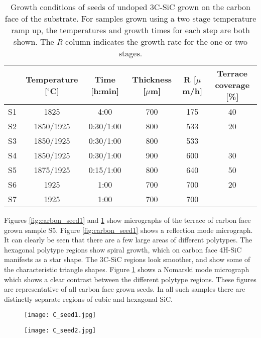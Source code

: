\begin{table}[h]
\small
\caption{Growth conditions of seeds of undoped 3C-SiC grown on the carbon face of the substrate. For samples grown using a two stage temperature ramp up, the temperatures and growth times for each step are both shown. The \emph{R}-column indicates the growth rate for the one or two stages.}
\label{tab:seeds}
\begin{center}
\begin{tabular}{l c c c c c}
  \hline                       
  \hline       
  \vspace{1mm}
   & \small{Temperature [$^\circ$C]} & \small{Time [h:min]} & \small{Thickness [$\mu$m]} & R [$\mu$m/h] &\small{Terrace coverage [\%]}\\
    \hline
  S1 & 1825 & 4:00 & 700 & 175 & 40\\
  S2 & 1850/1925 & 0:30/1:00 & 800 & 533 &20\\
  S3 & 1850/1925 & 0:30/1:00 & 800 & 533 &\\
  S4 & 1850/1925 & 0:30/1:00 & 900 & 600 &30\\
  S5 & 1875/1925 & 0:15/1:00 & 800 & 640 & 50\\
  S6 & 1925 & 1:00 & 700 & 700 & 20\\
  S7 & 1925 & 1:00 & 700 & 700 &\\
  \hline  
\end{tabular}
\end{center}
\end{table}


Figures \ref{fig:carbon_seed1} and \ref{fig:carbon_seed2} show micrographs of the terrace of carbon face grown sample S5. Figure \ref{fig:carbon_seed1} shows a reflection mode micrograph. It can clearly be seen that there are a few large areas of different polytypes. The hexagonal polytype regions show spiral growth, which on carbon face 4H-SiC manifests as a star shape. The 3C-SiC regions look smoother, and show some of the characteristic triangle shapes. Figure \ref{fig:carbon_seed2} shows a Nomarski mode micrograph which shows a clear contrast between the different polytype regions. These figures are representative of all carbon face grown seeds. In all such samples there are distinctly separate regions of cubic and hexagonal SiC. 

\begin{figure}[h]
\centering
\begin{minipage}{.5\textwidth}
  \centering
  \texttt{[image: C\_seed1.jpg]}
  \label{fig:carbon_seed1}
\end{minipage}%
\begin{minipage}{.5\textwidth}
  \centering
  \texttt{[image: C\_seed2.jpg]}
  \label{fig:carbon_seed2}
\end{minipage}
\end{figure}

